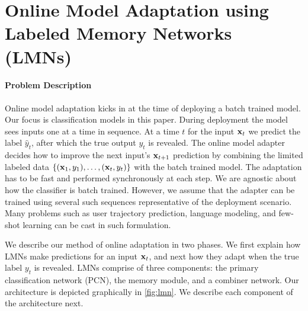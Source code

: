 \documentclass[letterpaper]{article} %
\newcommand{\vek}[1]{{\bf {#1}}}
\newcommand{\vx}{{\vek{x}}}
\begin{document}
\section{Online Model Adaptation using Labeled Memory Networks (LMNs)}
%
\label{sec-online}
\paragraph{Problem Description}
Online model adaptation kicks in at the time of deploying a batch trained model. Our focus is classification models in this paper.  During deployment the model sees inputs one at a time in sequence.  At a time $t$ for the input $\vx_t$ we predict the label  $\hat{y}_t$,  after which the true output $y_t$ is revealed.  The online model adapter decides how to improve the next input's $\vx_{t+1}$ prediction by combining the limited labeled data $\{(\vx_1,y_1),\ldots,(\vx_t,y_t)\}$ with the batch trained model.  The adaptation has to be fast and performed synchronously at each step.  We are agnostic about how the classifier is batch trained. However, we assume that the adapter can be trained using several such sequences representative of the deployment scenario.
Many problems such as user trajectory prediction, language modeling, and few-shot learning can be cast in such formulation.



We describe our method of online adaptation in two phases.  We first explain how LMNs make predictions for an input $\vx_t$, and next how they adapt when the true label $y_t$ is revealed.  LMNs comprise of three components: the primary classification network (PCN), the memory module, and a combiner network. Our architecture is depicted graphically in \ref{fig:lmn}. We describe each component of the architecture next.
\end{document}

